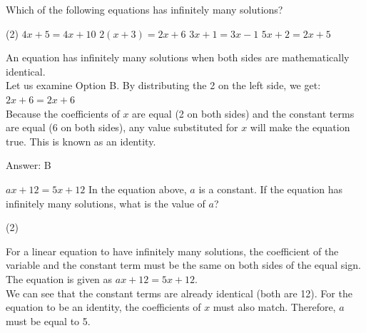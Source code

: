\documentclass[11pt,paper=a4,answers]{exam}
\begin{document}
\begin{questions}
\pointsinrightmargin
\pointsdroppedatright
\marksnotpoints
{}
\pointformat{\boldmath\themarginpoints}
\bracketedpoints

\question
Which of the following equations has infinitely many solutions?
\begin{tasks}(2)
    \task $4x + 5 = 4x + 10$
    \task $2(x + 3) = 2x + 6$
    \task $3x + 1 = 3x - 1$
    \task $5x + 2 = 2x + 5$
\end{tasks}

\begin{solution}
An equation has infinitely many solutions when both sides are mathematically identical. 
\\[10pt]
Let us examine Option B. By distributing the 2 on the left side, we get:
\\[10pt]
$2x + 6 = 2x + 6$ 
\\[10pt]
Because the coefficients of $x$ are equal (2 on both sides) and the constant terms are equal (6 on both sides), any value substituted for $x$ will make the equation true. This is known as an identity.

\vspace{20pt}
Answer: \colorbox{yellow!100}{B}
\end{solution}

\question
$ax + 12 = 5x + 12$
In the equation above, $a$ is a constant. If the equation has infinitely many solutions, what is the value of $a$?
\begin{tasks}(2)
\end{tasks}

\begin{solution}
For a linear equation to have infinitely many solutions, the coefficient of the variable and the constant term must be the same on both sides of the equal sign. 
\\[10pt]
The equation is given as $ax + 12 = 5x + 12$. 
\\[10pt]
We can see that the constant terms are already identical (both are 12). For the equation to be an identity, the coefficients of $x$ must also match. Therefore, $a$ must be equal to 5.


\end{solution}
\end{questions}
\end{document}
